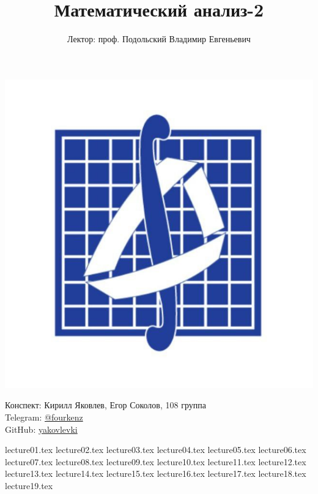 \documentclass[a4paper, 12pt]{article}
\title{\textbf{Математический анализ-2}}
\author{Лектор: проф. Подольский Владимир Евгеньевич}
\begin{document}
    
\fontsize{14pt}{20pt}\selectfont
\maketitle
\vspace{0.3cm}
\begin{center}
    \includegraphics[width=0.75\linewidth]{Images/mehmat.png}
\end{center}
\vspace{1.5cm}
\begin{center}
    Конспект: Кирилл Яковлев, Егор Соколов, 108 группа\\
    Telegram: \href{https://t.me/fourkenz}{@fourkenz}\\
    GitHub: \href{https://github.com/yakovlevki}{yakovlevki}\\
\end{center}
    
\newpage
\tableofcontents
\newpage

{lecture01.tex}
{lecture02.tex}
{lecture03.tex}
{lecture04.tex}
{lecture05.tex}
{lecture06.tex}
{lecture07.tex}
{lecture08.tex}
{lecture09.tex}
{lecture10.tex}
{lecture11.tex}
{lecture12.tex}
{lecture13.tex}
{lecture14.tex}
{lecture15.tex}
{lecture16.tex}
{lecture17.tex}
{lecture18.tex}
{lecture19.tex}
\end{document}
